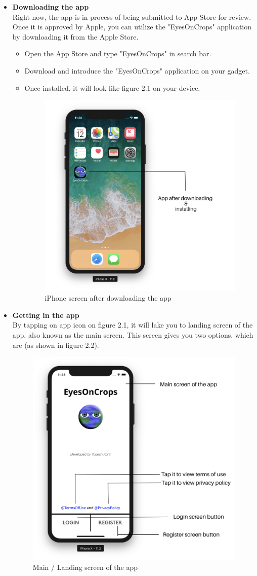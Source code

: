 \begin{itemize}
    \item \textbf{Downloading the app} \\
    Right now, the app is in process of being submitted to App Store for review. Once it is approved by Apple, you can utilize the "EyesOnCrops" application by downloading it from the Apple Store. 
    
    \begin{itemize}
        \item Open the App Store and type "EyesOnCrops" in search bar.
        \item Download and introduce the "EyesOnCrops" application on your gadget.
        \item Once installed, it will look like figure 2.1 on your device.
        
        \begin{figure}[H]
            \centering
            \includegraphics[width=0.50\linewidth]{figures/ch2/app_icon_screen.png}
            \caption{\label{fig:app_icon_screen} iPhone screen after downloading the app}
        \end{figure}
    \end{itemize}
    
    \item \textbf{Getting in the app} \\
    By tapping on app icon on figure 2.1, it will lake you to landing screen of the app, also known as the main screen. This screen gives you two options, which are (as shown in figure 2.2).
     
        \begin{figure}[H]
            \centering
            \includegraphics[width=0.50\linewidth]{figures/ch2/main_screen.png}
            \caption{\label{fig:main_screen} Main / Landing screen of the app}
        \end{figure}


\end{itemize}
